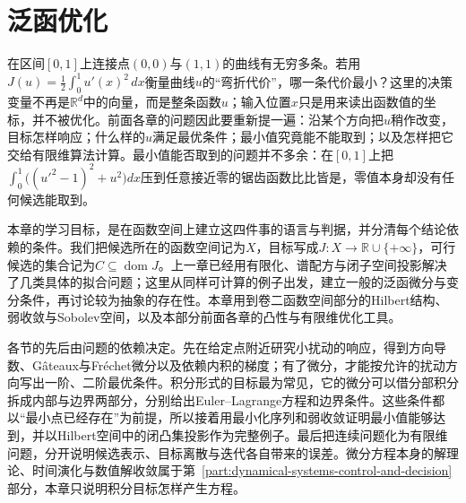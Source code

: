 \chapter{泛函优化}
\label{chap:opt-functional}

在区间$[0,1]$上连接点$(0,0)$与$(1,1)$的曲线有无穷多条。若用$J(u)=\frac12\int_0^1u'(x)^2\,dx$衡量曲线$u$的“弯折代价”，哪一条代价最小？这里的决策变量不再是$\mathbb R^d$中的向量，而是整条函数$u$；输入位置$x$只是用来读出函数值的坐标，并不被优化。前面各章的问题因此要重新提一遍：沿某个方向把$u$稍作改变，目标怎样响应；什么样的$u$满足最优条件；最小值究竟能不能取到；以及怎样把它交给有限维算法计算。最小值能否取到的问题并不多余：在$[0,1]$上把$\int_0^1\bigl((u'^2-1)^2+u^2\bigr)dx$压到任意接近零的锯齿函数比比皆是，零值本身却没有任何候选能取到。

本章的学习目标，是在函数空间上建立这四件事的语言与判据，并分清每个结论依赖的条件。我们把候选所在的函数空间记为$X$，目标写成$J:X\to\mathbb R\cup\{+\infty\}$，可行候选的集合记为$C\subseteq\operatorname{dom}J$。上一章已经用有限化、谱配方与闭子空间投影解决了几类具体的拟合问题；这里从同样可计算的例子出发，建立一般的泛函微分与变分条件，再讨论较为抽象的存在性。本章用到卷二函数空间部分的Hilbert结构、弱收敛与Sobolev空间，以及本部分前面各章的凸性与有限维优化工具。

各节的先后由问题的依赖决定。先在给定点附近研究小扰动的响应，得到方向导数、Gâteaux与Fréchet微分以及依赖内积的梯度；有了微分，才能按允许的扰动方向写出一阶、二阶最优条件。积分形式的目标最为常见，它的微分可以借分部积分拆成内部与边界两部分，分别给出Euler--Lagrange方程和边界条件。这些条件都以“最小点已经存在”为前提，所以接着用最小化序列和弱收敛证明最小值能够达到，并以Hilbert空间中的闭凸集投影作为完整例子。最后把连续问题化为有限维问题，分开说明候选表示、目标离散与迭代各自带来的误差。微分方程本身的解理论、时间演化与数值解收敛属于第~\ref{part:dynamical-systems-control-and-decision}部分，本章只说明积分目标怎样产生方程。







